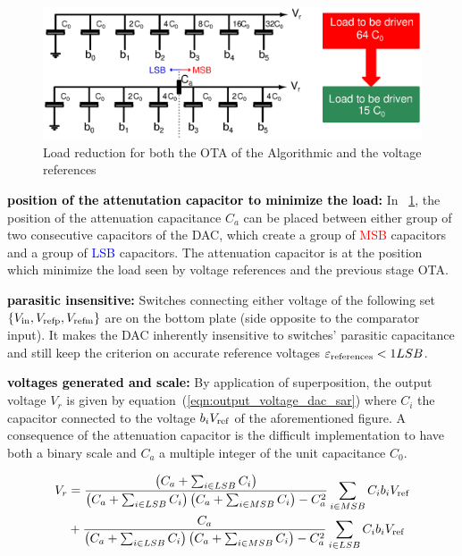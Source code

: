 \begin{figure}[htp]
	\centering
	\includegraphics[width=\textwidth]{Chapter4/Figs/sar-dac-normal-split-cap.ps}
	\caption{Load reduction for both the OTA of the Algorithmic and the voltage references}
	\label{fig:sar-dac-normal-split-cap}
\end{figure}
\textbf{\textcolor{black}{position of the attenutation capacitor to minimize the load:}}
In \figurename~\ref{fig:sar-dac-normal-split-cap}, the position of the attenuation capacitance \(C_a\) can be placed between either group of two consecutive capacitors of the DAC, which create a group of \textcolor{red}{MSB} capacitors and a group of \textcolor{blue}{LSB} capacitors. The attenuation capacitor is at the position which minimize the load seen by voltage references and the previous stage OTA\@.

\textbf{\textcolor{black}{parasitic insensitive:}}
Switches connecting either voltage of the following set \(\left\{ V_{\rm in}, V_{\rm refp}, V_{\rm refm} \right\} \) are on the bottom plate (side opposite to the comparator input). It makes the DAC inherently insensitive to switches' parasitic capacitance and still keep the criterion on accurate reference voltages \(\varepsilon_{\rm references} < 1 LSB\).

\textbf{\textcolor{black}{voltages generated and scale:}}
By application of superposition, the output voltage \(V_r\) is given by equation~(\ref{eqn:output_voltage_dac_sar}) where \(C_i\) the capacitor connected to the voltage \(b_i V_{\rm ref}\) of the aforementioned figure. A consequence of the attenuation capacitor is the difficult implementation to have both a binary scale and \(C_a\) a multiple integer of the unit capacitance \(C_0\).

\begin{align}
	\label{eqn:output_voltage_dac_sar}
	V_r &= \frac{\left(C_a + \sum_{i \in LSB}{C_i}\right)}{\left(C_a + \sum_{i \in LSB}{C_i}\right)\left(C_a + \sum_{i \in MSB}{C_i}\right)-C_a^2} \sum_{i \in MSB}{C_i b_i} V_{\rm ref} \nonumber \\
	&+ \frac{C_a}{\left(C_a + \sum_{i \in LSB}{C_i}\right)\left(C_a + \sum_{i \in MSB}{C_i}\right)-C_a^2} \sum_{i \in LSB}{C_i b_i} V_{\rm ref}
\end{align}

